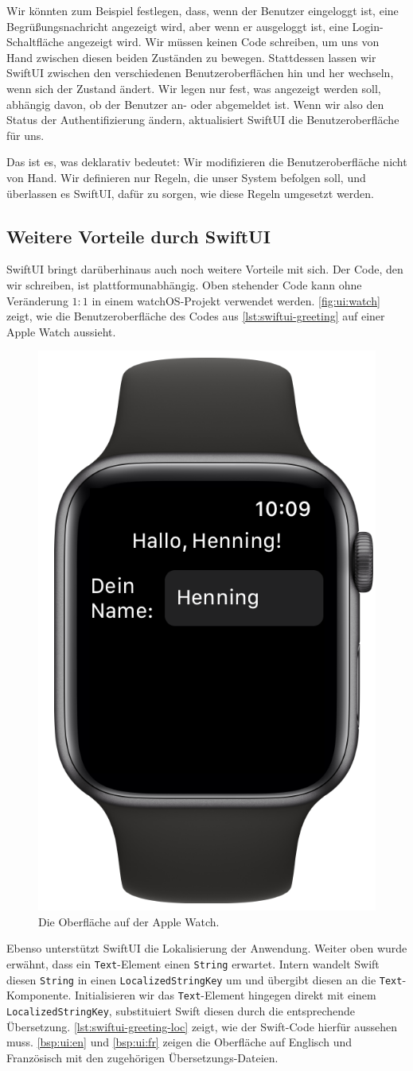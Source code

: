 Wir könnten zum Beispiel festlegen, dass, wenn der Benutzer eingeloggt ist, eine Begrüßungsnachricht angezeigt wird, aber wenn er ausgeloggt ist, eine Login-Schaltfläche angezeigt wird. Wir müssen keinen Code schreiben, um uns von Hand zwischen diesen beiden Zuständen zu bewegen. Stattdessen lassen wir SwiftUI zwischen den verschiedenen Benutzeroberflächen hin und her wechseln, wenn sich der Zustand ändert. Wir legen nur fest, was angezeigt werden soll, abhängig davon, ob der Benutzer an- oder abgemeldet ist. Wenn wir also den Status der Authentifizierung ändern, aktualisiert SwiftUI die Benutzeroberfläche für uns.

Das ist es, was deklarativ bedeutet: Wir modifizieren die Benutzeroberfläche nicht von Hand. Wir definieren nur Regeln, die unser System befolgen soll, und überlassen es SwiftUI, dafür zu sorgen, wie diese Regeln umgesetzt werden.

\subsection{Weitere Vorteile durch SwiftUI}

SwiftUI bringt darüberhinaus auch noch weitere Vorteile mit sich. Der Code, den wir schreiben, ist plattformunabhängig. Oben stehender Code kann ohne Veränderung $ 1:1 $ in einem watchOS-Projekt verwendet werden. \autoref{fig:ui:watch} zeigt, wie die Benutzeroberfläche des Codes aus \autoref{lst:swiftui-greeting} auf einer Apple Watch aussieht.

\begin{figure}
	\centering
	\includegraphics[width=.3\textwidth]{./images/methodology/swiftui/watch.png}
	\caption{\label{fig:ui:watch}Die Oberfläche auf der Apple Watch.}
\end{figure}

Ebenso unterstützt SwiftUI die Lokalisierung der Anwendung. Weiter oben wurde erwähnt, dass ein \texttt{Text}-Element einen \texttt{String} erwartet. Intern wandelt Swift diesen \texttt{String} in einen \texttt{LocalizedStringKey} um und übergibt diesen an die \texttt{Text}-Komponente. Initialisieren wir das \texttt{Text}-Element hingegen direkt mit einem \texttt{LocalizedStringKey}, substituiert Swift diesen durch die entsprechende Übersetzung. \autoref{lst:swiftui-greeting-loc} zeigt, wie der Swift-Code hierfür aussehen muss. \autoref{bsp:ui:en} und \autoref{bsp:ui:fr} zeigen die Oberfläche auf Englisch und Französisch mit den zugehörigen Übersetzungs-Dateien.

